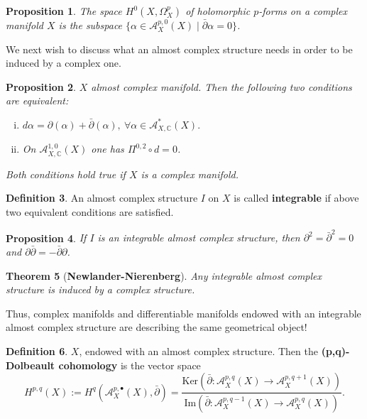 \documentclass{article}
\theoremstyle{definition}
\newtheorem{definition}{Definition}[subsection]
\theoremstyle{plain}
\newtheorem{theorem}[definition]{Theorem}
\newtheorem{proposition}[definition]{Proposition}
\begin{document}
\begin{proposition}\label{abc}
    The space $ H^0(X,\varOmega^p_X) $ of holomorphic $ p $-forms on a complex manifold $ X $ is the subspace $ \{\alpha\in \mathcal{A}^{p,0}_X(X)\mid \bar{\partial}\alpha=0\} $.
\end{proposition}

We next wish to discuss what an almost complex structure needs in order to be induced by a complex one.

\begin{proposition}
    $ X $ almost complex manifold. Then the following two conditions are equivalent:\begin{enumerate}[(i)]
            \item $ d\alpha=\partial(\alpha)+\bar{\partial}(\alpha),\ \forall\alpha\in\mathcal{A}^*_{X,\mathbb{C}}(X). $
            \item On $ \mathcal{A}^{1,0}_{X,\mathbb{C}}(X) $ one has $ \varPi^{0,2}\circ d=0 $.
    \end{enumerate}Both conditions hold true if $ X $ is a complex manifold.
\end{proposition}

\begin{definition}
    An almost complex structure $ I $ on $ X $ is called \textbf{integrable} if above two equivalent conditions are satisfied. 
\end{definition}

\begin{proposition}
    If $ I $ is an integrable almost complex structure, then $ \partial^2=\bar{\partial}^2=0 $ and $ \partial\bar{\partial}=-\bar{\partial}\partial $.
\end{proposition}

\begin{theorem}[\textbf{Newlander-Nierenberg}]
    Any integrable almost complex structure is induced by a complex structure.
\end{theorem}

Thus, complex manifolds and differentiable manifolds endowed with an integrable almost complex structure are describing the same geometrical object!

\begin{definition}
    $ X $, endowed with an almost complex structure. Then the \textbf{(p,q)-Dolbeault cohomology} is the vector space\[
        H^{p,q}(X):=H^q(\mathcal{A}^{p,\bullet}_X(X),\bar{\partial})=\frac{\mathrm{Ker}(\bar{\partial}:\mathcal{A}^{p,q}_X(X)\rightarrow\mathcal{A}^{p,q+1}_X(X))}{\mathrm{Im}(\bar{\partial}:\mathcal{A}^{p,q-1}_X(X)\rightarrow\mathcal{A}^{p,q}_X(X))}.
    \]
\end{definition}
\end{document}
